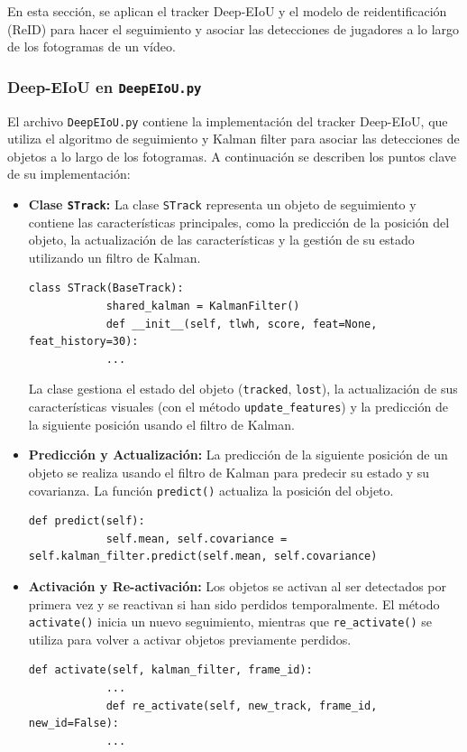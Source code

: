 \documentclass[12pt, a4paper, twoside]{article}
\begin{document}
	En esta sección, se aplican el tracker Deep-EIoU y el modelo de reidentificación (ReID) para hacer el seguimiento y asociar las detecciones de jugadores a lo largo de los fotogramas de un vídeo.
	
	\subsubsection{Deep-EIoU en \texttt{DeepEIoU.py}}
	
	El archivo \texttt{DeepEIoU.py} contiene la implementación del tracker Deep-EIoU, que utiliza el algoritmo de seguimiento y Kalman filter para asociar las detecciones de objetos a lo largo de los fotogramas. A continuación se describen los puntos clave de su implementación:
	
	\begin{itemize}
		\item \textbf{Clase \texttt{STrack}:}  
		La clase \texttt{STrack} representa un objeto de seguimiento y contiene las características principales, como la predicción de la posición del objeto, la actualización de las características y la gestión de su estado utilizando un filtro de Kalman.
		\begin{lstlisting}[style=pythonstyle]
			class STrack(BaseTrack):
			shared_kalman = KalmanFilter()
			def __init__(self, tlwh, score, feat=None, feat_history=30):
			...
		\end{lstlisting}
		
		La clase gestiona el estado del objeto (\texttt{tracked}, \texttt{lost}), la actualización de sus características visuales (con el método \texttt{update\_features}) y la predicción de la siguiente posición usando el filtro de Kalman.
		
		\item \textbf{Predicción y Actualización:}  
		La predicción de la siguiente posición de un objeto se realiza usando el filtro de Kalman para predecir su estado y su covarianza. La función \texttt{predict()} actualiza la posición del objeto.
		\begin{lstlisting}[style=pythonstyle]
			def predict(self):
			self.mean, self.covariance = self.kalman_filter.predict(self.mean, self.covariance)
		\end{lstlisting}
		
		\item \textbf{Activación y Re-activación:}  
		Los objetos se activan al ser detectados por primera vez y se reactivan si han sido perdidos temporalmente. El método \texttt{activate()} inicia un nuevo seguimiento, mientras que \texttt{re\_activate()} se utiliza para volver a activar objetos previamente perdidos.
		\begin{lstlisting}[style=pythonstyle]
			def activate(self, kalman_filter, frame_id):
			...
			def re_activate(self, new_track, frame_id, new_id=False):
			...
		\end{lstlisting}
		

\end{itemize}
\end{document}
